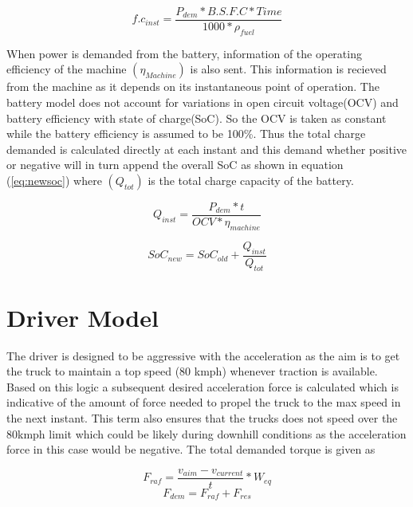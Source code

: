 \documentclass[MastersThesis.tex]{subfiles}
\begin{document}
\begin{equation} \label{eq:fueldem}
f.c_{inst}=\frac{P_{dem}* B.S.F.C * Time}{1000*\rho_{fuel}}
\end{equation}

When power is demanded from the battery, information of the operating efficiency of the machine $(\eta_{Machine})$  is also sent. This information is recieved from the machine as it depends on its instantaneous point of operation. The battery model does not account for variations in open circuit voltage(OCV) and battery efficiency with state of charge(SoC). So the OCV is taken as constant while the battery efficiency is assumed to be 100\%. Thus the total charge demanded is calculated directly at each instant and this demand whether positive or negative will in turn append the overall SoC as shown in equation (\ref{eq:newsoc}) where $(Q_{tot})$ is the total charge capacity of the battery.

\begin{equation} \label{eq:instantchargedem}
Q_{inst}=\frac{P_{dem} * t }{OCV * \eta_{machine} }
\end{equation}

\begin{equation} \label{eq:newsoc}
SoC_{new} =SoC_{old}+ \frac{Q_{inst}}{Q_{tot}}
\end{equation}

\section{Driver Model}
\label{sec:drivermodel}

The driver is designed to be aggressive with the acceleration as the aim is to get the truck to maintain a top speed (80 kmph) whenever traction is available. Based on this logic a subsequent desired acceleration force is calculated which is indicative of the amount of force needed to propel the truck to the max speed in the next instant. This term also ensures that the trucks does not speed over the 80kmph limit which could be likely during downhill conditions as the acceleration force in this case would be negative. The total demanded torque is given as

\begin{equation} \label{eq:reqacclforce}
F_{raf} =\frac {v_{aim}- v_{current}}{t}*W_{eq}
\end{equation}
\begin{equation} \label{eq:totdemforce}
F_{dem} = F_{raf}+F_{res}
\end{equation}
\end{document}
